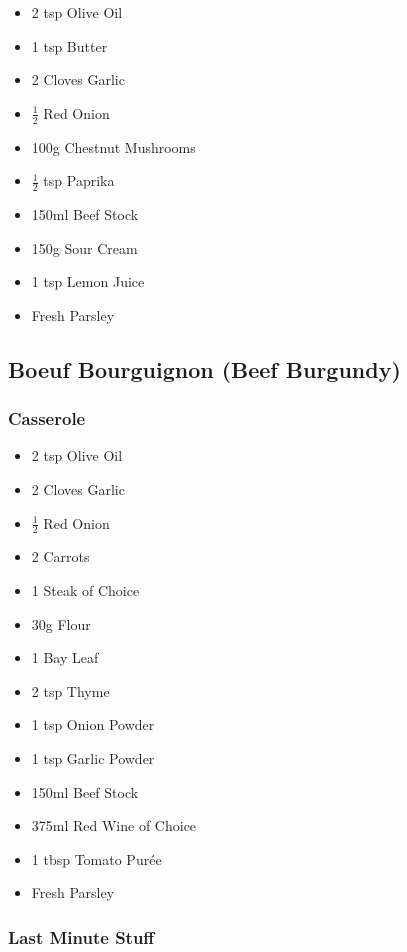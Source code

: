 \documentclass[11pt, english]{article}
\begin{document}
	\begin{itemize}
	\setlength\itemsep{0cm}
		\item 2 tsp Olive Oil
		\item 1 tsp Butter
		\item 2 Cloves Garlic
		\item $\frac{1}{2}$ Red Onion
		\item 100g Chestnut Mushrooms
		\item $\frac{1}{2}$ tsp Paprika
		\item 150ml Beef Stock
		\item 150g Sour Cream
		\item 1 tsp Lemon Juice
		\item Fresh Parsley
	\end{itemize}

\newpage

	\subsection{Boeuf Bourguignon (Beef Burgundy)}

		\subsubsection*{Casserole}

	\begin{itemize}
	\setlength\itemsep{0cm}
		\item 2 tsp Olive Oil
		\item 2 Cloves Garlic
		\item $\frac{1}{2}$ Red Onion
		\item 2 Carrots
		\item 1 Steak of Choice
		\item 30g Flour
		\item 1 Bay Leaf
		\item 2 tsp Thyme
		\item 1 tsp Onion Powder
		\item 1 tsp Garlic Powder
		\item 150ml Beef Stock
		\item 375ml Red Wine of Choice
		\item 1 tbsp Tomato Pur\'{e}e 
		\item Fresh Parsley
	\end{itemize}

		\subsubsection*{Last Minute Stuff}
\end{document}
